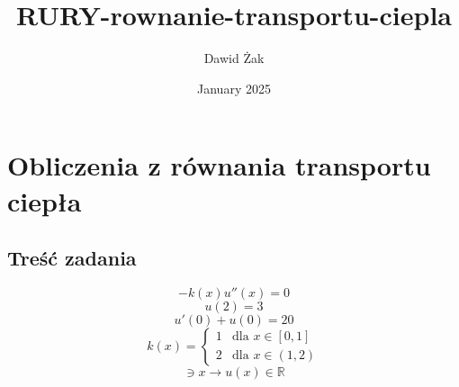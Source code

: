 \documentclass{article}
\title{RURY-rownanie-transportu-ciepla}
\author{Dawid Żak}
\date{January 2025}
\begin{document}
\maketitle

\section{Obliczenia z równania transportu ciepła}
\subsection{Treść zadania}
\begin{equation}
    -k(x)u''(x)=0 
\end{equation}
\begin{equation}
    u(2) = 3 
\end{equation}
\begin{equation}
    u'(0)+u(0)=20
    \label{brzeg}
\end{equation}
\begin{equation}
    k(x) = 
    \begin{cases} 
      1 & \text{dla } x \in [0, 1] \\ 
      2 & \text{dla } x \in (1, 2)
    \end{cases}
\label{eq:piecewise}
\end{equation}
\begin{equation*}
    [0,2]\ni x \rightarrow u(x) \in \mathbb{R}
\end{equation*}
\end{document}
